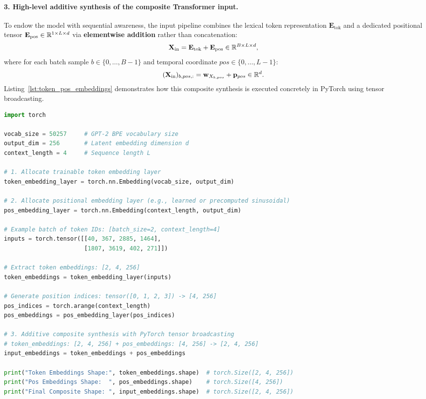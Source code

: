\documentclass[../../main.tex]{subfiles}
\begin{document}
\paragraph{3. High-level additive synthesis of the composite Transformer input.}
To endow the model with sequential awareness, the input pipeline combines the lexical token representation $\mathbf{E}_{\text{tok}}$ and a dedicated positional tensor $\mathbf{E}_{\text{pos}} \in \mathbb{R}^{1 \times L \times d}$ via \textbf{elementwise addition} rather than concatenation:
\begin{equation}
\label{eq:composite_input_tensor}
\mathbf{X}_{\text{in}} = \mathbf{E}_{\text{tok}} + \mathbf{E}_{\text{pos}} \in \mathbb{R}^{B \times L \times d},
\end{equation}
where for each batch sample $b \in \{0, \dots, B-1\}$ and temporal coordinate $pos \in \{0, \dots, L-1\}$:
\begin{equation}
(\mathbf{X}_{\text{in}})_{b, pos, :} = \mathbf{w}_{X_{b, pos}} + \mathbf{p}_{pos} \in \mathbb{R}^d.
\end{equation}
Listing~\ref{lst:token_pos_embeddings} demonstrates how this composite synthesis is executed concretely in PyTorch using tensor broadcasting.

\begin{lstlisting}[language=Python, caption={PyTorch synthesis of token embeddings and positional embeddings \cite{raschka2024llm}.}, label={lst:token_pos_embeddings}]
import torch

vocab_size = 50257     # GPT-2 BPE vocabulary size
output_dim = 256       # Latent embedding dimension d
context_length = 4     # Sequence length L

# 1. Allocate trainable token embedding layer
token_embedding_layer = torch.nn.Embedding(vocab_size, output_dim)

# 2. Allocate positional embedding layer (e.g., learned or precomputed sinusoidal)
pos_embedding_layer = torch.nn.Embedding(context_length, output_dim)

# Example batch of token IDs: [batch_size=2, context_length=4]
inputs = torch.tensor([[40, 367, 2885, 1464],
                       [1807, 3619, 402, 271]])

# Extract token embeddings: [2, 4, 256]
token_embeddings = token_embedding_layer(inputs)

# Generate position indices: tensor([0, 1, 2, 3]) -> [4, 256]
pos_indices = torch.arange(context_length)
pos_embeddings = pos_embedding_layer(pos_indices)

# 3. Additive composite synthesis with PyTorch tensor broadcasting
# token_embeddings: [2, 4, 256] + pos_embeddings: [4, 256] -> [2, 4, 256]
input_embeddings = token_embeddings + pos_embeddings

print("Token Embeddings Shape:", token_embeddings.shape)  # torch.Size([2, 4, 256])
print("Pos Embeddings Shape:  ", pos_embeddings.shape)    # torch.Size([4, 256])
print("Final Composite Shape: ", input_embeddings.shape)  # torch.Size([2, 4, 256])
\end{lstlisting}
\end{document}
